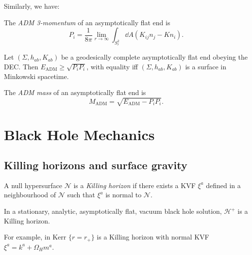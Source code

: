 \documentclass{jknotes}
\begin{document}
Similarly, we have:
\begin{defn}
    The \emph{ADM 3-momentum} of an asymptotically flat end is
    \begin{equation}
        P_i = \frac{1}{8\pi}\lim_{r\to\infty}\int_{S^2_r} \dd{A}(K_{ij}n_j-Kn_i).
    \end{equation}
\end{defn}

\begin{theorem}
    Let \((\Sigma, h_{ab}, K_{ab})\) be a geodesically complete asymptotically flat end obeying the DEC. Then \(E_{\text{ADM}} \ge \sqrt{P_iP_i}\), with equality iff \((\Sigma,h_{ab},K_{ab})\) is a surface in Minkowski spacetime.
\end{theorem}

\begin{defn}
    The \emph{ADM mass} of an asymptotically flat end is
    \begin{equation}
        M_{\text{ADM}} = \sqrt{E_{\text{ADM}} - P_iP_i}.
    \end{equation}
\end{defn}

\section{Black Hole Mechanics}
\subsection{Killing horizons and surface gravity}
\begin{defn}
    A null hypersurface \(\mathcal{N}\) is a \emph{Killing horizon} if there exists a KVF \(\xi^a\) defined in a neighbourhood of \(\mathcal{N}\) such that \(\xi^a\) is normal to \(\mathcal{N}\).
\end{defn}
\begin{theorem}
    In a stationary, analytic, asymptotically flat, vacuum black hole solution, \(\mathcal{H}^+\) is a Killing horizon.
\end{theorem}
For example, in Kerr \(\{r=r_+\}\) is a Killing horizon with normal KVF \(\xi^a = k^a+\Omega_H m^a\).
\end{document}
